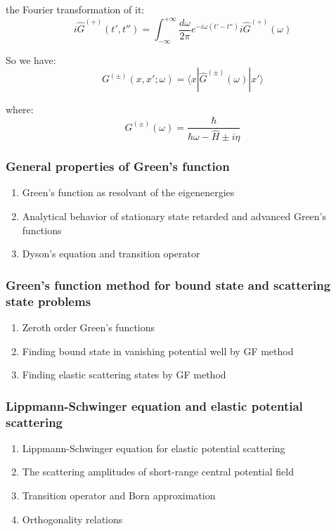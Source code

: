 \documentclass[12pt]{article}
\numberwithin{equation}{section}
\begin{document}
\begin{enumerate}
	the Fourier transformation of it:
	\begin{equation}
		i\hat{G}^{(+)}(t',t'')=\int_{-\infty}^{+\infty}\frac{d\omega}{2\pi}e^{-i\omega(t'-t'')}i\hat{G}^{(+)}(\omega)
	\end{equation}	\par
	So we have:
	\begin{equation}
		G^{(\pm)}(x,x';\omega)=\langle x|\hat{G}^{(\pm)}(\omega)|x'\rangle
	\end{equation}	\par
	where:
	\begin{equation}
		G^{(\pm)}(\omega)=\frac{\hbar}{\hbar\omega-\hat{H}\pm i\eta}
	\end{equation}	\par
\end{enumerate}
\subsubsection{General properties of Green's function}
\begin{enumerate}
\item Green's function as resolvant of the eigenenergies
\item Analytical behavior of stationary state retarded and advanced Green's functions
\item Dyson's equation and transition operator
\end{enumerate}
\subsubsection{Green's function method for bound state and scattering state problems}
\begin{enumerate}
\item Zeroth order Green's functions
\item Finding bound state in vanishing potential well by GF method
\item Finding elastic scattering states by GF method
\end{enumerate}
\subsubsection{Lippmann-Schwinger equation and elastic potential scattering}
\begin{enumerate}
\item Lippmann-Schwinger equation for elastic potential scattering
\item The scattering amplitudes of short-range central potential field
\item Transition operator and Born approximation
\item Orthogonality relations
\end{enumerate}
\end{document}
